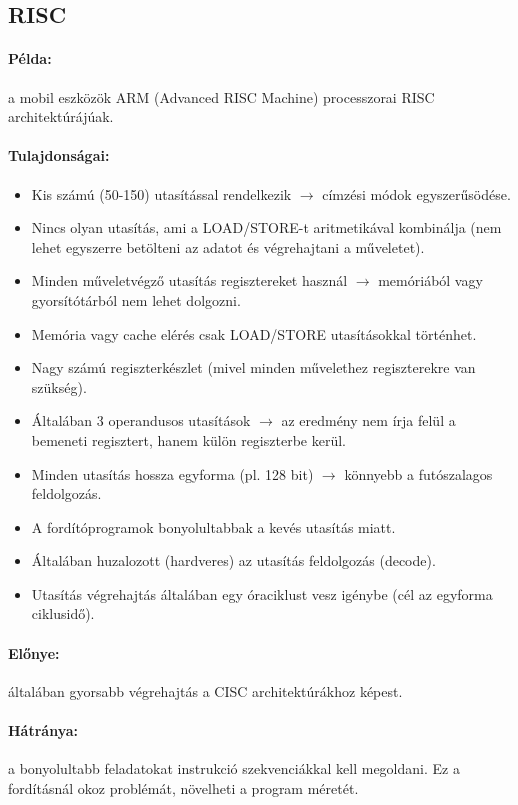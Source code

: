 \subsection{RISC}
\paragraph{Példa:} a mobil eszközök ARM (Advanced RISC Machine) processzorai RISC architektúrájúak.
\paragraph{Tulajdonságai:}
\begin{itemize}
    \item Kis számú (50-150) utasítással rendelkezik $\rightarrow$ címzési módok egyszerűsödése.
    \item Nincs olyan utasítás, ami a LOAD/STORE-t aritmetikával kombinálja (nem lehet egyszerre betölteni az adatot és végrehajtani a műveletet).
    \item Minden műveletvégző utasítás regisztereket használ $\rightarrow$ memóriából vagy gyorsítótárból nem lehet dolgozni.
    \item Memória vagy cache elérés csak LOAD/STORE utasításokkal történhet.
    \item Nagy számú regiszterkészlet (mivel minden művelethez regiszterekre van szükség).
    \item Általában 3 operandusos utasítások $\rightarrow$ az eredmény nem írja felül a bemeneti regisztert, hanem külön regiszterbe kerül.
    \item Minden utasítás hossza egyforma (pl. 128 bit) $\rightarrow$ könnyebb a futószalagos feldolgozás.
    \item A fordítóprogramok bonyolultabbak a kevés utasítás miatt.
    \item Általában huzalozott (hardveres) az utasítás feldolgozás (decode).
    \item Utasítás végrehajtás általában egy óraciklust vesz igénybe (cél az egyforma ciklusidő).
\end{itemize}
\paragraph{Előnye:} általában gyorsabb végrehajtás a CISC architektúrákhoz képest.
\paragraph{Hátránya:} a bonyolultabb feladatokat instrukció szekvenciákkal kell megoldani.
Ez a fordításnál okoz problémát, növelheti a program méretét.

